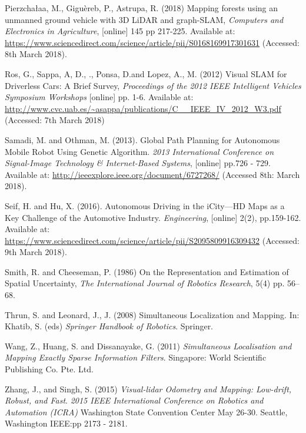 \documentclass[a4paper, 12pt]{article}
\begin{document}
Pierzchałaa, M., Giguèreb, P., Astrupa, R. (2018) Mapping forests using an unmanned ground vehicle with 3D LiDAR and graph-SLAM, \textit{Computers and Electronics in Agriculture}, [online] 145 pp 217-225. Available at: \url{https://www.sciencedirect.com/science/article/pii/S0168169917301631} (Accessed: 8th March 2018).

Ros, G., Sappa, A, D., ., Ponsa, D.and Lopez, A., M. (2012) Visual SLAM for Driverless Cars: A Brief Survey, \textit{Proceedings of the 2012 IEEE Intelligent Vehicles Symposium Workshops} [online] pp. 1-6. Available at: \url{http://www.cvc.uab.es/~asappa/publications/C__IEEE_IV_2012_W3.pdf} (Accessed: 7th March 2018)

Samadi, M. and Othman, M. (2013). Global Path Planning for Autonomous Mobile Robot Using Genetic Algorithm. \textit{2013 International Conference on Signal-Image Technology \& Internet-Based Systems}, [online] pp.726 - 729. Available at: \url{http://ieeexplore.ieee.org/document/6727268/} (Accessed 8th: March 2018).

Seif, H. and Hu, X. (2016). Autonomous Driving in the iCity—HD Maps as a Key Challenge of the Automotive Industry. \textit{Engineering}, [online] 2(2), pp.159-162. Available at: \url{https://www.sciencedirect.com/science/article/pii/S2095809916309432} (Accessed: 9th March 2018).

Smith, R. and Cheeseman, P. (1986) On the Representation and Estimation of
Spatial Uncertainty, \textit{The International Journal of Robotics Research},
5(4) pp. 56–68. 

Thrun, S. and Leonard, J., J. (2008) Simultaneous Localization and Mapping. In: Khatib, S. (eds) \textit{Springer Handbook of Robotics}. Springer.

Wang, Z., Huang, S. and Dissanayake, G. (2011) \textit{Simultaneous Localisation and Mapping Exactly Sparse Information Filters}. Singapore: World Scientific Publishing Co. Pte. Ltd.

Zhang, J., and Singh, S. (2015) \textit{Visual-lidar Odometry and Mapping: Low-drift, Robust, and Fast}. \textit{2015 IEEE International Conference on Robotics and Automation (ICRA)} Washington State Convention Center May 26-30. Seattle, Washington IEEE:pp 2173 - 2181.
\end{document}
